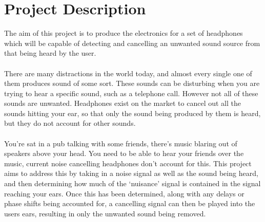 \section{Project Description}
The aim of this project is to produce the electronics for a set of headphones which will be capable of detecting and cancelling an unwanted sound source from that being heard by the user.
\\
\\
There are many distractions in the world today, and almost every single one of them produces sound of some sort.
These sounds can be disturbing when you are trying to hear a specific sound, such as a telephone call.
However not all of these sounds are unwanted.
Headphones exist on the market to cancel out all the sounds hitting your ear, so that only the sound being produced by them is heard, but they do not account for other sounds.
\\
\\
You're sat in a pub talking with some friends, there's music blaring out of speakers above your head.
You need to be able to hear your friends over the music, current noise cancelling headphones don't account for this.
This project aims to address this by taking in a noise signal as well as the sound being heard, and then determining how much of the `nuisance' signal is contained in the signal reaching your ears.
Once this has been determined, along with any delays or phase shifts being accounted for, a cancelling signal can then be played into the users ears, resulting in only the unwanted sound being removed.
